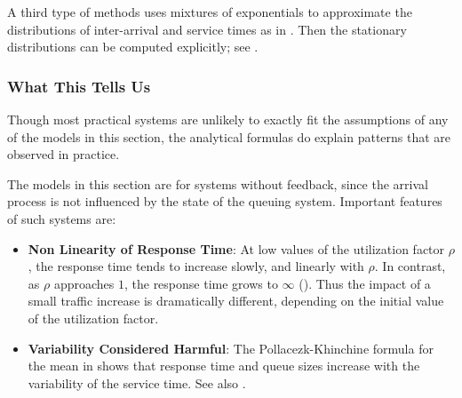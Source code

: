 A third type of methods uses mixtures of exponentials to
approximate the distributions of inter-arrival and service
times as in . Then the stationary distributions
can be computed explicitly; see
\cite{le1988steady,neuts1981stationary}.


\subsubsection{What This Tells Us} Though most
practical systems are unlikely to exactly fit the
assumptions of any of the models in this section,
the analytical formulas do explain patterns that
are observed in practice.
%
\begin{figure}[htbp]
\end{figure}
%
The models in this section are for systems
without feedback, since the arrival process is
not influenced by the state of the queuing
system. Important features of such systems are:
%
 \begin{itemize}
 \item \textbf{Non Linearity of Response Time}:
 At low values of the utilization factor $\rho$,
 the response time tends to increase slowly, and
 linearly with $\rho$. In contrast, as $\rho$
 approaches $1$, the response time grows to
 $\infty$ (). Thus the impact of
 a small traffic increase is dramatically
 different, depending on the initial value of the
 utilization factor.
%
 \item \textbf{Variability Considered Harmful}: The
     Pollacezk-Khinchine formula for the mean in
 shows that response time and queue sizes
increase with the variability of the service time. See also
.
 \end{itemize}
\begin{figure}[htbp]
\end{figure}

